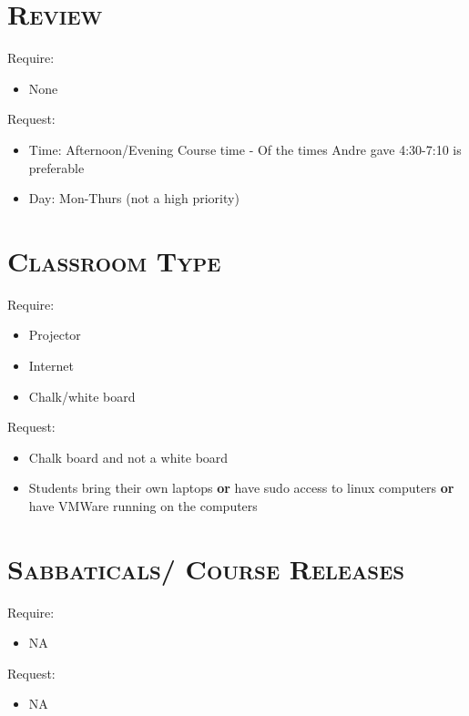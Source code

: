 \begin{resume}




\section{\textsc{Review}}


Require:
\begin{itemize}
\item None
\end{itemize}

Request:
\begin{itemize}
\item Time: Afternoon/Evening Course time - Of the times Andre gave 4:30-7:10 is preferable
\item Day: Mon-Thurs (not a high priority) 
\end{itemize}







\section{\textsc{Classroom Type}}
Require:
\begin{itemize}
\item Projector
\item Internet
\item Chalk/white board
\end{itemize}

Request:
\begin{itemize}
\item Chalk board and not a white board
\item Students bring their own laptops \textbf{or} have sudo access to linux computers \textbf{or} have VMWare running on the computers
\end{itemize}



\section{\textsc{Sabbaticals/ Course Releases}}
Require:
\begin{itemize}
\item NA
\end{itemize}

Request:
\begin{itemize}
\item NA 
\end{itemize}







\end{resume}
